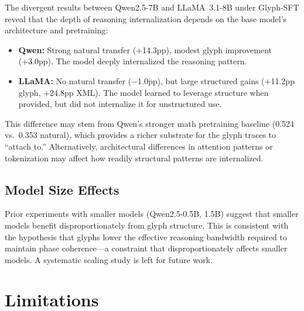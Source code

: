\documentclass[11pt]{article}
\begin{document}
The divergent results between Qwen2.5-7B and LLaMA~3.1-8B under Glyph-SFT reveal that the depth of reasoning internalization depends on the base model's architecture and pretraining:

\begin{itemize}
    \item \textbf{Qwen:} Strong natural transfer (+14.3pp), modest glyph improvement (+3.0pp). The model deeply internalized the reasoning pattern.
    \item \textbf{LLaMA:} No natural transfer ($-$1.0pp), but large structured gains (+11.2pp glyph, +24.8pp XML). The model learned to leverage structure when provided, but did not internalize it for unstructured use.
\end{itemize}

This difference may stem from Qwen's stronger math pretraining baseline (0.524 vs.\ 0.353 natural), which provides a richer substrate for the glyph traces to ``attach to.'' Alternatively, architectural differences in attention patterns or tokenization may affect how readily structural patterns are internalized.

\subsection{Model Size Effects}

Prior experiments with smaller models (Qwen2.5-0.5B, 1.5B) suggest that smaller models benefit disproportionately from glyph structure. This is consistent with the hypothesis that glyphs lower the effective reasoning bandwidth required to maintain phase coherence---a constraint that disproportionately affects smaller models. A systematic scaling study is left for future work.

\section{Limitations}
\end{document}
